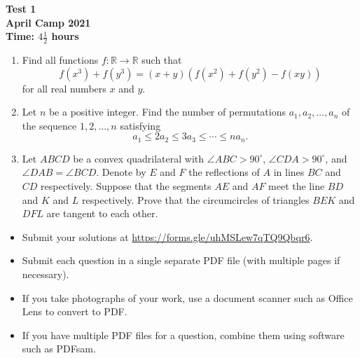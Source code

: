 \documentclass{article}
\begin{document}
\thispagestyle{empty}

\begin{center}
  \textbf{\Large Test 1}
  \\ \vspace{1em}
  \textbf{\large April Camp 2021}
  \\ \vspace{1em}
  \textbf{\large Time: $4\frac{1}{2}$ hours}
\end{center}

\vfill

\begin{enumerate}[itemsep=18pt]

\item %
Find all functions $f: \mathbb{R} \to \mathbb{R}$ such that
\[
  f\left( x^3 \right) + f\left( y^3 \right) = (x + y)\left( f\left( x^2 \right) + f\left( y^2 \right) - f(xy) \right)
\]
for all real numbers $x$ and $y$.


\item %
Let $n$ be a positive integer.
Find the number of permutations $a_1, a_2, \dotsc, a_n$ of the sequence $1, 2, \dotsc, n$ satisfying
\[ a_1 \leq 2a_2 \leq 3a_3 \leq \dotsb \leq na_n. \]


\item %
Let $ABCD$ be a convex quadrilateral with $\angle ABC > 90^\circ$, $\angle CDA > 90^\circ$, and $\angle DAB = \angle BCD$.
Denote by $E$ and $F$ the reflections of $A$ in lines $BC$ and $CD$ respectively.
Suppose that the segments $AE$ and $AF$ meet the line $BD$ and $K$ and $L$ respectively.
Prove that the circumcircles of triangles $BEK$ and $DFL$ are tangent to each other.

\end{enumerate}


\vfill
\vfill
\begin{itemize}
	\item Submit your solutions at \url{https://forms.gle/uhMSLew7qTQ9Qbqr6}.
	\item Submit each question in a single separate PDF file (with multiple pages if necessary).
	\item If you take photographs of your work, use a document scanner such as Office Lens to convert to PDF.
	\item If you have multiple PDF files for a question, combine them using software such as PDFsam.
\end{itemize}
\end{document}
